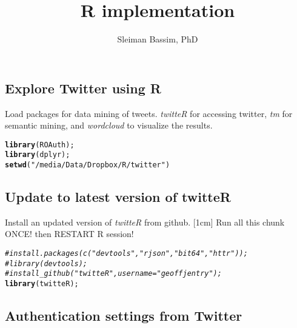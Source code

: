 \documentclass[9pt,english]{extarticle}\usepackage[]{graphicx}\usepackage[]{color}
\title{R implementation}
\author{Sleiman Bassim, PhD}
\makeatletter
\newcommand{\hlstr}[1]{\textcolor[rgb]{0.192,0.494,0.8}{#1}}%
\newcommand{\hlcom}[1]{\textcolor[rgb]{0.678,0.584,0.686}{\textit{#1}}}%
\newcommand{\hlstd}[1]{\textcolor[rgb]{0.345,0.345,0.345}{#1}}%
\newcommand{\hlkwd}[1]{\textcolor[rgb]{0.737,0.353,0.396}{\textbf{#1}}}%
\newenvironment{kframe}{%
 \def\at@end@of@kframe{}%
 \ifinner\ifhmode%
  \def\at@end@of@kframe{\end{minipage}}%
  \begin{minipage}{\columnwidth}%
 \fi\fi%
 \def\FrameCommand##1{\hskip\@totalleftmargin \hskip-\fboxsep
 \colorbox{shadecolor}{##1}\hskip-\fboxsep
     \hskip-\linewidth \hskip-\@totalleftmargin \hskip\columnwidth}%
 \MakeFramed {\advance\hsize-\width
   \@totalleftmargin\z@ \linewidth\hsize
   \@setminipage}}%
 {\par\unskip\endMakeFramed%
 \at@end@of@kframe}
\newenvironment{knitrout}{}{} %
\makeatother
\begin{document}
\maketitle
\begin{linenumbers}


 

\section{Explore Twitter using R}
\label{sec:explore}


\noindent
Load packages for data mining of tweets. \emph{twitteR} for accessing twitter, \emph{tm} for semantic mining, and \emph{wordcloud} to visualize the results.
\begin{knitrout}
\color{fgcolor}\begin{kframe}
\begin{alltt}
\hlkwd{library}\hlstd{(ROAuth);}
\hlkwd{library}\hlstd{(dplyr);}
\hlkwd{setwd}\hlstd{(}\hlstr{"/media/Data/Dropbox/R/twitter"}\hlstd{)}
\end{alltt}
\end{kframe}
\end{knitrout}

\subsection{Update to latest version of twitteR}
\label{subsec:twitteR}

\noindent
Install an updated version of \emph{twitteR} from github.
[1cm]
Run all this chunk ONCE! then RESTART R session!
\begin{knitrout}
\color{fgcolor}\begin{kframe}
\begin{alltt}
\hlcom{#install.packages(c("devtools","rjson","bit64","httr"));}
\hlcom{#library(devtools);}
\hlcom{#install_github("twitteR",username="geoffjentry");}
\hlkwd{library}\hlstd{(twitteR);}
\end{alltt}
\end{kframe}
\end{knitrout}


\subsection{Authentication settings from Twitter}
\label{subsec:authenticate}


\end{linenumbers}
\end{document}
